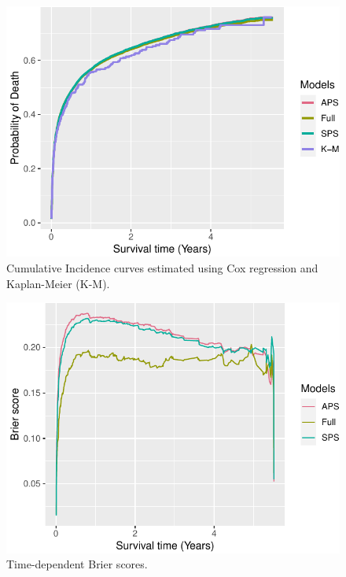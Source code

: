 \documentclass[
]{jss}
\begin{document}
\begin{CodeChunk}
\begin{figure}

{\centering \includegraphics{../figures/baselines-1} 

}

\caption{\label{fig:baselines} Cumulative Incidence curves estimated using Cox regression and Kaplan-Meier (K-M).}\label{fig:baselines}
\end{figure}
\end{CodeChunk}

\begin{CodeChunk}
\begin{figure}

{\centering \includegraphics{../figures/brierpt1-1} 

}

\caption{\label{fig:brier1} Time-dependent Brier scores.}\label{fig:brierpt1}
\end{figure}
\end{CodeChunk}
\end{document}
